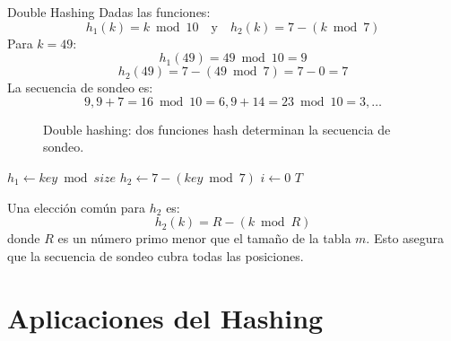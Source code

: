 \begin{ejemplo}{Double Hashing}
Dadas las funciones:
\[
h_1(k) = k \bmod 10 \quad \text{y} \quad h_2(k) = 7 - (k \bmod 7)
\]
Para \(k = 49\):
\[
h_1(49) = 49 \bmod 10 = 9
\]
\[
h_2(49) = 7 - (49 \bmod 7) = 7 - 0 = 7
\]
La secuencia de sondeo es:
\[
9, 9+7=16 \bmod 10=6, 9+14=23 \bmod 10=3, \ldots
\]
\end{ejemplo}

\begin{figure}[htbp]
    \centering
    \caption{Double hashing: dos funciones hash determinan la secuencia de sondeo.}
    \label{fig:double-hashing}
\end{figure}

\begin{algorithm}[H]
\caption{Inserción con Double Hashing}
\label{alg:double-hashing-insert}
\(h_1 \leftarrow key \bmod size\)\;
\(h_2 \leftarrow 7 - (key \bmod 7)\)\;
\(i \leftarrow 0\)\;
\Return \(T\)\;
\end{algorithm}

\begin{observacion}
Una elección común para \(h_2\) es:
\[
h_2(k) = R - (k \bmod R)
\]
donde \(R\) es un número primo menor que el tamaño de la tabla \(m\). Esto asegura que la secuencia de sondeo cubra todas las posiciones.
\end{observacion}

\section{Aplicaciones del Hashing}
\label{sec:aplicaciones}

